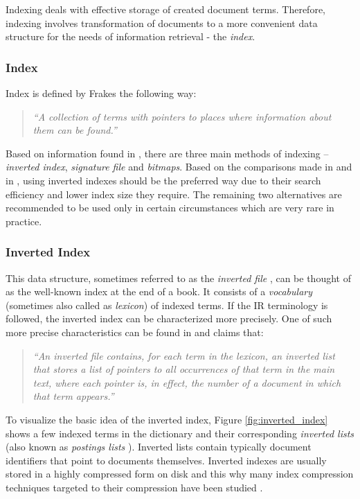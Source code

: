 Indexing deals with effective storage of created document terms.
Therefore, indexing involves transformation of documents to a more convenient data structure for the needs of information retrieval - the \textit{index}.

\subsubsection{Index}

Index is defined by Frakes \cite{IRDataAlgorithms} the following way: 
	\begin{quote}
	\textsl{``A collection of terms with pointers to places where information about them can be found.''} 	
	\end{quote}
Based on information found in \cite{Witten:1999:MGC:323905, IRDataAlgorithms, ManningRaghavanSchuetze08}, there are three main methods of indexing – \textit{inverted index}, \textit{signature file} and \textit{bitmaps}. Based on the comparisons made in \cite{Witten:1999:MGC:323905} and in \cite{Zobel:1996:GPC:234889.234891}, using inverted indexes should be the preferred way due to their search efficiency and lower index size they require. The remaining two alternatives are recommended to be used only in certain circumstances which are very rare in practice. 

\subsubsection{Inverted Index}

This data structure, sometimes referred to as the \textit{inverted file} \cite{IRDataAlgorithms}, can be thought of as the well-known index at the end of a book. 
It consists of a \textit{vocabulary} (sometimes also called as \textit{lexicon}) of indexed terms.
If the IR terminology is followed, the inverted index can be characterized more precisely. One of such more precise characteristics can be found in \cite{Witten:1999:MGC:323905} and claims that:

\begin{quote}
		\textsl{``An inverted file contains, for each term in the lexicon, an inverted list that stores a list of pointers to all occurrences of that term in the main text, where each pointer is, in effect, the number of a document in which that term appears.''}
	\end{quote}
	
	To visualize the basic idea of the inverted index, Figure \ref{fig:inverted_index} shows a few indexed terms in the dictionary and their corresponding \textit{inverted lists} (also known as \textit{postings lists} \cite{IR:ImplemEvalSearchEng}).
	Inverted lists contain typically document identifiers that point to documents themselves.
	Inverted indexes are usually stored in a highly compressed form on disk and this why many index compression techniques targeted to their compression have been studied \cite{Zhang05efficientquery}. 

